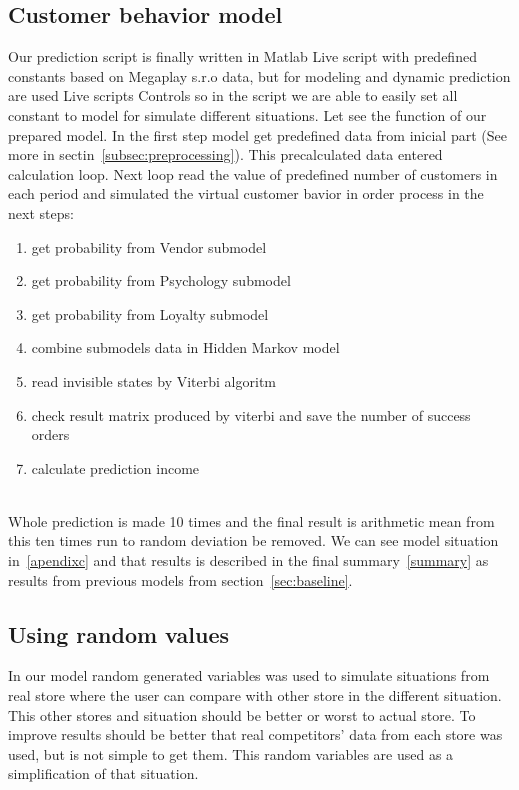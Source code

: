 \subsection{Customer behavior model} \label{sec:cbm}
Our prediction script is finally written in Matlab Live script with predefined constants based on Megaplay s.r.o data,
but for modeling and dynamic prediction are used Live scripts Controls so in the script we are able to easily set all constant to model for simulate different situations.
Let see the function of our prepared model.
In the first step model get predefined data from inicial part (See more in sectin~\ref{subsec:preprocessing}).
This precalculated data entered calculation loop.
Next loop read the value of predefined number of customers in each period and simulated the virtual customer bavior in order process in the next steps:
\begin{enumerate}
    \item get probability from Vendor submodel
    \item get probability from Psychology submodel
    \item get probability from Loyalty submodel
    \item combine submodels data in Hidden Markov model
    \item read invisible states by Viterbi algoritm
    \item check result matrix produced by viterbi and save the number of success orders
    \item calculate prediction income
\end{enumerate}\\
Whole prediction is made 10 times and the final result is arithmetic mean from this ten times run to random deviation be removed.
We can see model situation in~\ref{apendixc} and that results is described in the final summary~\ref{summary} as results from previous models from section~\ref{sec:baseline}.
\subsection{Using random values} \label{subsec:rand}
In our model random generated variables was used to simulate situations from real store where the user can compare with other store in the different situation.
This other stores and situation should be better or worst to actual store.
To improve results should be better that real competitors' data from each store was used, but is not simple to get them.
This random variables are used as a simplification of that situation.
